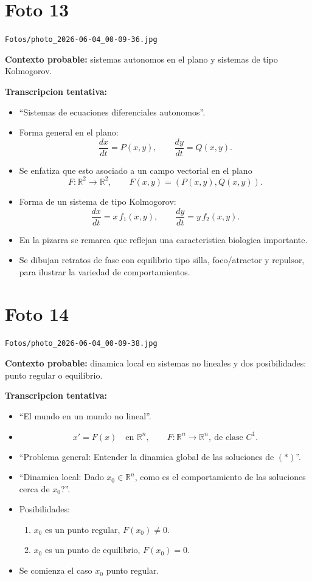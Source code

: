 \documentclass[11pt,letterpaper]{article}
\begin{document}
\section*{Foto 13}
\texttt{Fotos/photo\_2026-06-04\_00-09-36.jpg}

\textbf{Contexto probable:} sistemas autonomos en el plano y sistemas de tipo Kolmogorov.

\textbf{Transcripcion tentativa:}
\begin{itemize}[leftmargin=*]
    \item ``Sistemas de ecuaciones diferenciales autonomos''.
    \item Forma general en el plano:
    \[
    \frac{dx}{dt}=P(x,y), \qquad \frac{dy}{dt}=Q(x,y).
    \]
    \item Se enfatiza que esto asociado a un campo vectorial en el plano
    \[
    F:\mathbb{R}^2 \to \mathbb{R}^2, \qquad F(x,y)=(P(x,y),Q(x,y)).
    \]
    \item Forma de un sistema de tipo Kolmogorov:
    \[
    \frac{dx}{dt}=x\,f_1(x,y), \qquad \frac{dy}{dt}=y\,f_2(x,y).
    \]
    \item En la pizarra se remarca que reflejan una caracteristica biologica importante.
    \item Se dibujan retratos de fase con equilibrio tipo silla, foco/atractor y repulsor, para ilustrar la variedad de comportamientos.
\end{itemize}

\section*{Foto 14}
\texttt{Fotos/photo\_2026-06-04\_00-09-38.jpg}

\textbf{Contexto probable:} dinamica local en sistemas no lineales y dos posibilidades: punto regular o equilibrio.

\textbf{Transcripcion tentativa:}
\begin{itemize}[leftmargin=*]
    \item ``El mundo en un mundo no lineal''.
    \item \[
    x' = F(x) \quad \text{en } \mathbb{R}^n,
    \qquad F:\mathbb{R}^n \to \mathbb{R}^n,\ \text{de clase } C^1.
    \]
    \item ``Problema general: Entender la dinamica global de las soluciones de \((*)\)''.
    \item ``Dinamica local: Dado \(x_0\in\mathbb{R}^n\), como es el comportamiento de las soluciones cerca de \(x_0\)?''.
    \item Posibilidades:
    \begin{enumerate}[leftmargin=*]
        \item \(x_0\) es un punto regular, \(F(x_0)\neq 0\).
        \item \(x_0\) es un punto de equilibrio, \(F(x_0)=0\).
    \end{enumerate}
    \item Se comienza el caso \(x_0\) punto regular.
\end{itemize}
\end{document}

